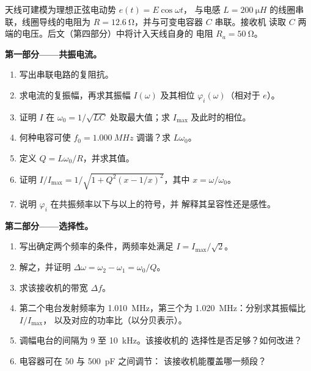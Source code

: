 \begin{problem}
\label{pb:b1:sinusoidal-impedance:1}
天线可建模为理想正弦电动势 $e(t) = E\cos\omega t$，
与电感 $L = \qty{200}{\micro H}$ 的线圈串联，线圈导线的电阻为
$R = \qty{12.6}{\ohm}$，并与可变电容器 $C$ 串联。接收机
读取 $C$ 两端的电压。后文（第四部分）中将计入天线自身的
电阻 $R_a = \qty{50}{\ohm}$。

\medskip
\noindent\textbf{第一部分——共振电流。}
\begin{enumerate}
  \item 写出串联电路的复阻抗。
  \item 求电流的复振幅，再求其振幅
        $I(\omega)$ 及其相位 $\varphi_i(\omega)$（相对于 $e$）。
  \item 证明 $I$ 在 $\omega_0 = 1/\sqrt{LC}$ 处取最大值；求
        $I_{\max}$ 及此时的相位。
  \item 何种电容可使 $f_0 = \qty{1.000}{MHz}$ 调谐？求
        $L\omega_0$。
  \item 定义 $Q = L\omega_0/R$，并求其值。
  \item 证明 $I/I_{\max} = 1/\sqrt{1 + Q^2(x - 1/x)^2}$，其中
        $x = \omega/\omega_0$。
  \item 说明 $\varphi_i$ 在共振频率以下与以上的符号，并
        解释其呈容性还是感性。
\end{enumerate}

\medskip
\noindent\textbf{第二部分——选择性。}
\begin{enumerate}[resume]
  \item 写出确定两个频率的条件，两频率处满足
        $I = I_{\max}/\sqrt2$。
  \item 解之，并证明 $\Delta\omega = \omega_2 - \omega_1 =
        \omega_0/Q$。
  \item 求该接收机的带宽 $\Delta f$。
  \item 第二个电台发射频率为 \qty{1.010}{MHz}，第三个为
        \qty{1.020}{MHz}：分别求其振幅比 $I/I_{\max}$，
        以及对应的功率比（以分贝表示）。
  \item 调幅电台的间隔为 \qty{9}{} 至 \qty{10}{kHz}。该接收机的
        选择性是否足够？如何改进？
  \item 电容器可在 \qty{50}{} 与 \qty{500}{pF} 之间调节：
        该接收机能覆盖哪一频段？
\end{enumerate}


\end{problem}
